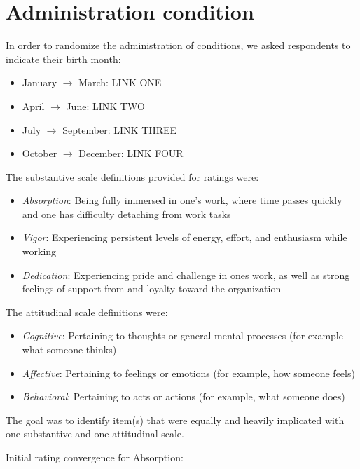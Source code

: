 \documentclass[
]{book}
\providecommand{\tightlist}{%
  \setlength{\itemsep}{0pt}\setlength{\parskip}{0pt}}
\begin{document}
\hypertarget{administration-condition}{%
\section{Administration condition}\label{administration-condition}}

In order to randomize the administration of conditions, we asked respondents to indicate their birth month:

\begin{itemize}
\tightlist
\item
  January \(\rightarrow\) March: LINK ONE
\item
  April \(\rightarrow\) June: LINK TWO
\item
  July \(\rightarrow\) September: LINK THREE
\item
  October \(\rightarrow\) December: LINK FOUR
\end{itemize}

The substantive scale definitions provided for ratings were:

\begin{itemize}
\tightlist
\item
  \emph{Absorption}: Being fully immersed in one's work, where time passes quickly and one has difficulty detaching from work tasks
\item
  \emph{Vigor}: Experiencing persistent levels of energy, effort, and enthusiasm while working
\item
  \emph{Dedication}: Experiencing pride and challenge in ones work, as well as strong feelings of support from and loyalty toward the organization
\end{itemize}

The attitudinal scale definitions were:

\begin{itemize}
\tightlist
\item
  \emph{Cognitive}: Pertaining to thoughts or general mental processes (for example what someone thinks)
\item
  \emph{Affective}: Pertaining to feelings or emotions (for example, how someone feels)
\item
  \emph{Behavioral}: Pertaining to acts or actions (for example, what someone does)
\end{itemize}

The goal was to identify item(s) that were equally and heavily implicated with one substantive and one attitudinal scale.

Initial rating convergence for Absorption:
\end{document}
